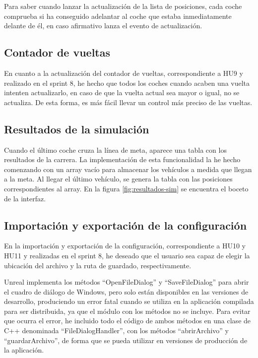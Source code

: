 Para saber cuando lanzar la actualización de la lista de posiciones, cada coche comprueba si ha conseguido adelantar al coche que estaba inmediatamente delante de él, en caso afirmativo lanza el evento de actualización.


\subsection{Contador de vueltas}

En cuanto a la actualización del contador de vueltas, correspondiente a HU9 y realizado en el sprint 8, he hecho que todos los coches cuando acaben una vuelta intenten actualizarlo, en caso de que la vuelta actual sea mayor o igual, no se actualiza. De esta forma, es más fácil llevar un control más preciso de las vueltas.

\subsection{Resultados de la simulación}

Cuando el último coche cruza la línea de meta, aparece una tabla con los resultados de la carrera. La implementación de esta funcionalidad la he hecho comenzando con un array vacío para almacenar los vehículos a medida que llegan a la meta. Al llegar el último vehículo, se genera la tabla con las posiciones correspondientes al array. En la figura \ref{fig:resultados-sim} se encuentra el boceto de la interfaz.


\subsection{Importación y exportación de la configuración}

En la importación y exportación de la configuración, correspondiente a HU10 y HU11 y realizadas en el sprint 8, he deseado que el usuario sea capaz de elegir la ubicación del archivo y la ruta de guardado, respectivamente. 

\bigskip

Unreal implementa los métodos ``OpenFileDialog'' y ``SaveFileDialog'' para abrir el cuadro de diálogo de Windows, pero solo están disponibles en las versiones de desarrollo, produciendo un error fatal cuando se utiliza en la aplicación compilada para ser distribuida, ya que el módulo con los métodos no se incluye. Para evitar que ocurra el error, he incluido todo el código de ambos métodos en una clase de C++ denominada ``FileDialogHandler'', con los métodos ``abrirArchivo'' y ``guardarArchivo'', de forma que se pueda utilizar en versiones de producción de la aplicación.

